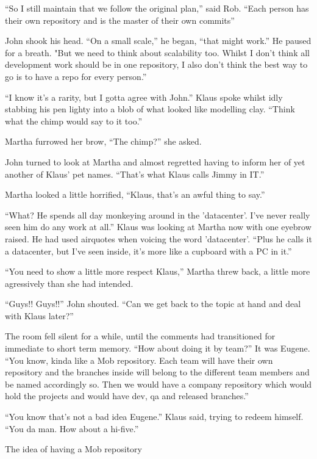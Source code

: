 \begin{trenches}
``So I still maintain that we follow the original plan,'' said Rob.  ``Each person has their own repository and is the master of their own commits''

John shook his head.  ``On a small scale,'' he began, ``that might work.''  He paused for a breath.  "But we need to think about scalability too.  Whilst I don't think all development work should be in one repository, I also don't think the best way to go is to have a repo for every person.''

``I know it's a rarity, but I gotta agree with John.''  Klaus spoke whilst idly stabbing his pen lighty into a blob of what looked like modelling clay.  ``Think what the chimp would say to it too.''

Martha furrowed her brow, ``The chimp?'' she asked.

John turned to look at Martha and almost regretted having to inform her of yet another of Klaus' pet names.  ``That's what Klaus calls Jimmy in IT.''  

Martha looked a little horrified, ``Klaus, that's an awful thing to say.''  

``What?  He spends all day monkeying around in the 'datacenter'.  I've never really seen him do any work at all.''  Klaus was looking at Martha now with one eyebrow raised.  He had used airquotes when voicing the word 'datacenter'.  ``Plus he calls it a datacenter, but I've seen inside, it's more like a cupboard with a PC in it.''

``You need to show a little more respect Klaus,'' Martha threw back, a little more agressively than she had intended.

``Guys!! Guys!!''  John shouted.  ``Can we get back to the topic at hand and deal with Klaus later?''

The room fell silent for a while, until the comments had transitioned for immediate to short term memory.  ``How about doing it by team?''  It was Eugene.  ``You know, kinda like a Mob repository.  Each team will have their own repository and the branches inside will belong to the different team members and be named accordingly so.  Then we would have a company repository which would hold the projects and would have dev, qa and released branches.''

``You know that's not a bad idea Eugene.''  Klaus said, trying to redeem himself.  ``You da man.  How about a hi-five.''

\end{trenches}

The idea of having a Mob repository 
